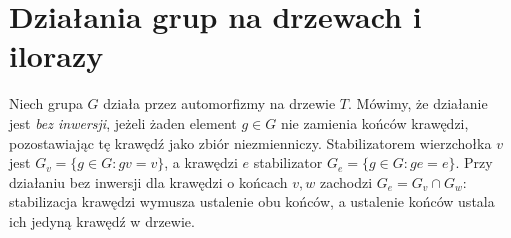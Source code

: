 \section{Działania grup na drzewach i ilorazy}
\label{sec:tg-tree-actions}

\begin{definicja}
Niech grupa $G$ działa przez automorfizmy na drzewie $T$.
Mówimy, że działanie jest \emph{bez inwersji}, jeżeli
żaden element $g\in G$ nie zamienia końców krawędzi,
pozostawiając tę krawędź jako zbiór niezmienniczy.
Stabilizatorem wierzchołka $v$ jest
$G_v=\{g\in G:gv=v\}$, a krawędzi $e$ stabilizator
$G_e=\{g\in G:ge=e\}$. Przy działaniu bez inwersji
dla krawędzi o końcach $v,w$ zachodzi
$G_e=G_v\cap G_w$: stabilizacja krawędzi wymusza
ustalenie obu końców, a ustalenie końców ustala
ich jedyną krawędź w drzewie.
\end{definicja}

